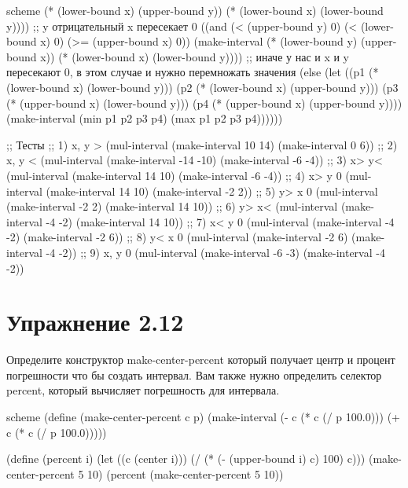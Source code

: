 \begin{codelisting}{scheme}
                                                             (* (lower-bound x) (upper-bound y))
                                                             (* (lower-bound x) (lower-bound y))))
        ;; y отрицательный x пересекает 0
        ((and (< (upper-bound y) 0) (< (lower-bound x) 0) (>= (upper-bound x) 0)) (make-interval
                                                             (* (lower-bound y) (upper-bound x))
                                                             (* (lower-bound x) (lower-bound y))))
        ;; иначе у нас и x и y пересекают 0, в этом случае и нужно перемножать значения
        (else (let ((p1 (* (lower-bound x) (lower-bound y)))
                    (p2 (* (lower-bound x) (upper-bound y)))
                    (p3 (* (upper-bound x) (lower-bound y)))
                    (p4 (* (upper-bound x) (upper-bound y))))
                (make-interval (min p1 p2 p3 p4)
                               (max p1 p2 p3 p4))))))

;; Тесты
;; 1) x, y >
(mul-interval (make-interval 10 14)
              (make-interval 0 6))
;; 2) x, y <
(mul-interval (make-interval -14 -10)
              (make-interval -6 -4))
;; 3) x> y<
(mul-interval (make-interval 14 10)
              (make-interval -6 -4))
;; 4) x> y 0
(mul-interval (make-interval 14 10)
              (make-interval -2 2))
;; 5) y> x 0
(mul-interval (make-interval -2 2)
              (make-interval 14 10))
;; 6) y> x<
(mul-interval (make-interval -4 -2)
              (make-interval 14 10))
;; 7) x< y 0
(mul-interval (make-interval -4 -2)
              (make-interval -2 6))
;; 8) y< x 0
(mul-interval (make-interval -2 6)
              (make-interval -4 -2))
;; 9) x, y 0
(mul-interval (make-interval -6 -3)
              (make-interval -4 -2))
\end{codelisting}

\chapter{Упражнение 2.12}

Определите конструктор make-center-percent который получает центр и процент погрешности что бы создать интервал. Вам также нужно определить селектор percent, который вычисляет погрешность для интервала.

\begin{codelisting}{scheme}
(define (make-center-percent c p)
  (make-interval (- c  (* c (/ p 100.0))) (+ c (* c (/ p 100.0)))))

(define (percent i)
  (let ((c (center i)))
    (/ (* (- (upper-bound i) c) 100) c)))
(make-center-percent 5 10)
(percent (make-center-percent 5 10))
\end{codelisting}

